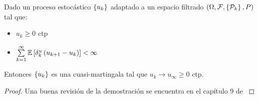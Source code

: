 \begin{theorem}
	\label{theorem: Convergencia de cuasi martingalas}
	Dado un proceso estoc\'astico $\left\lbrace u_k\right\rbrace$ adaptado a un espacio filtrado $\left(\Omega, \mathcal{F}, \left\lbrace\mathcal{P}_k\right\rbrace, P\right)$ tal que:
	
	\begin{itemize}
		\item $u_k \geq 0$ ctp
		\item $\sum\limits_{k=1}^{\infty} {\mathbb{E} \left[\delta^u_k\left(u_{k+1} - u_k\right)\right]} < \infty$
	\end{itemize}
	
	Entonces $\left\lbrace u_k\right\rbrace$ es una cuasi-martingala tal que $u_k \rightarrow u_{\infty} \geq 0$ ctp.
	
\end{theorem}

\begin{proof}
	Una buena revisi\'on de la demostraci\'on se encuentra en el cap\'itulo 9 de \cite{metivier:1983}
\end{proof}
